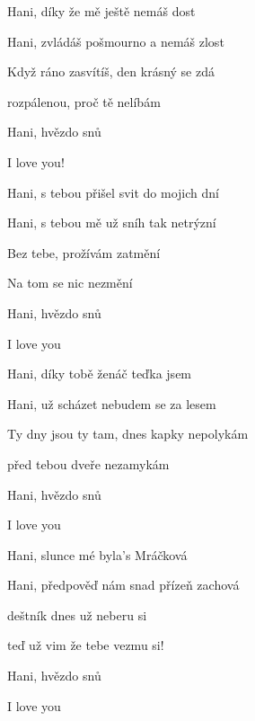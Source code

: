 

\zs
Hani, díky že mě ještě nemáš dost

Hani, zvládáš pošmourno a nemáš zlost

Když ráno zasvítíš, den krásný se zdá

rozpálenou, proč tě nelíbám

Hani, hvězdo snů

I love you!
\ks

\zs
Hani, s tebou přišel svit do mojich dní

Hani, s tebou mě už sníh tak netrýzní

Bez tebe, prožívám zatmění

Na tom se nic nezmění

Hani, hvězdo snů

I love you
\ks

\zs
Hani, díky tobě ženáč teďka jsem

Hani, už scházet nebudem se za lesem

Ty dny jsou ty tam, dnes kapky nepolykám

před tebou dveře nezamykám

Hani, hvězdo snů

I love you
\ks

\zs
Hani, slunce mé byla's Mráčková

Hani, předpověď nám snad přízeň zachová

deštník dnes už neberu si

teď už vim že tebe vezmu si!

Hani, hvězdo snů

I love you
\ks

\kp
